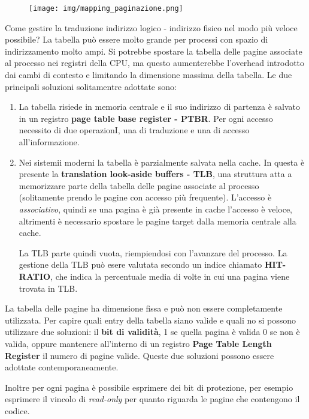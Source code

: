 \documentclass{article}
\begin{document}
\begin{figure}[h!]
    \begin{center}
        \texttt{[image: img/mapping\_paginazione.png]}     
    \end{center}
\end{figure}

\noindent Come gestire la traduzione indirizzo logico - indirizzo fisico nel modo più veloce possibile? La tabella può essere molto grande
per processi con spazio di indirizzamento molto ampi. Si potrebbe spostare la tabella delle pagine associate al processo nei registri della 
CPU, ma questo aumenterebbe l'overhead introdotto dai cambi di contesto e limitando la dimensione massima della tabella.
Le due principali soluzioni solitamentre adottate sono:
\begin{enumerate}
    \item La tabella risiede in memoria centrale e il suo indirizzo di partenza è salvato in un registro \textbf{page table base register - PTBR}.
     Per ogni accesso necessito di due operazionI, una di traduzione e una di accesso all'informazione.
    \item Nei sistemii moderni la tabella è parzialmente salvata nella cache. In questa è presente la \textbf{translation look-aside buffers - TLB},
    una struttura atta a memorizzare parte della tabella delle pagine associate al processo (solitamente prendo le pagine con accesso più frequente).
    L'accesso è \textit{associativo}, quindi se una pagina è già presente in cache l'accesso è veloce, altrimenti è necessario spostare
    le pagine target dalla memoria centrale alla cache.

    \noindent La TLB parte quindi vuota, riempiendosi con l'avanzare del processo. La gestione della TLB può esere valutata secondo un indice
    chiamato \textbf{HIT-RATIO}, che indica la percentuale media di volte in cui una pagina viene trovata in TLB.
\end{enumerate}

\noindent La tabella delle pagine ha dimensione fissa e può non essere completamente utilizzata. Per capire quali entry della tabella siano
valide e quali no si possono utilizzare due soluzioni: il \textbf{bit di validità}, 1 se quella pagina è valida 0 se non è valida,
oppure mantenere all'interno di un registro \textbf{Page Table Length Register} il numero di pagine valide. 
Queste due soluzioni possono essere adottate contemporaneamente. 
\medskip

\noindent Inoltre per ogni pagina è possibile esprimere dei bit di protezione, per esempio esprimere il vincolo di \textit{read-only} per
quanto riguarda le pagine che contengono il codice. 
\end{document}
